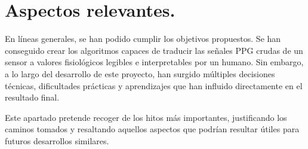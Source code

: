 \section{Aspectos relevantes.}

En líneas generales, se han podido cumplir los objetivos propuestos. Se
han conseguido crear los algoritmos capaces de traducir las señales PPG crudas de un sensor a valores fisiológicos legibles e interpretables por un humano. Sin embargo, a lo largo del desarrollo de este proyecto, han surgido múltiples decisiones técnicas, dificultades prácticas y aprendizajes que han influido directamente en el resultado final. 

Este apartado pretende recoger de los hitos más importantes, justificando los caminos tomados y resaltando aquellos aspectos que podrían resultar útiles para futuros desarrollos similares.

